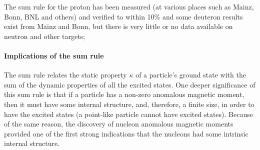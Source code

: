 \begin{comment}
The sum rule was derived in the late 1960s based on some very general assumptions as follows:
\begin{enumerate}
\item \textbf{Lorentz and gauge invarianc}e in the form of the \textbf{low energy theorem of Low, Goldman and Goldberger} %
\item \textbf{Unitarity} in the form of the \textbf{optical theorem}
\item \textbf{Causality} in the form of an \textbf{unsubtracted dispersion relation for forward Compton scattering}. %
\end{enumerate}
\end{comment}

The sum rule for the proton has been measured (at various places such as Mainz, Bonn, BNL %
and others) and verified to within 10\% \cite{PhysRevLett.91.192001, PhysRevLett.94.162001, Drechsel:2004ki, PhysRevLett.102.172002} and some deuteron results exist from Mainz and Bonn, but there is very little or no data available on neutron and other targets;%

\paragraph{Implications of the sum rule} 
The sum rule relates the static property $\kappa$ of a particle's ground state with the sum of the dynamic properties of all the excited states. One deeper significance of this sum rule is that if a particle has a non-zero anomalous magnetic moment, then it must have some internal structure, and, therefore, a finite size, in order to have the excited states (a point-like particle cannot have excited states).
Because of the same reason, the discovery of nucleon anomalous magnetic moments provided one of the first strong indications that the nucleons had some intrinsic internal structure.

